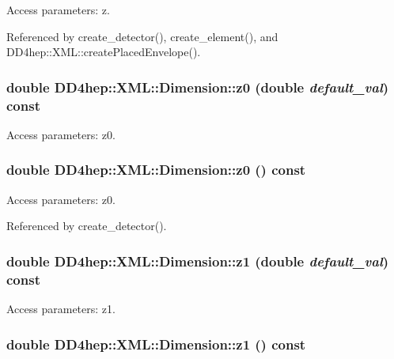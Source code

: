 Access parameters: z. 

Referenced by create\_\-detector(), create\_\-element(), and DD4hep::XML::createPlacedEnvelope().\hypertarget{struct_d_d4hep_1_1_x_m_l_1_1_dimension_a2839cdcdcb0d64a06bf6ab5288a38c35}{
\subsubsection[{z0}]{\setlength{\rightskip}{0pt plus 5cm}double DD4hep::XML::Dimension::z0 (double {\em default\_\-val}) const}}
\label{struct_d_d4hep_1_1_x_m_l_1_1_dimension_a2839cdcdcb0d64a06bf6ab5288a38c35}


Access parameters: z0. \hypertarget{struct_d_d4hep_1_1_x_m_l_1_1_dimension_ac2a0b56de03d8f4e6b04618a048bbd46}{
\subsubsection[{z0}]{\setlength{\rightskip}{0pt plus 5cm}double DD4hep::XML::Dimension::z0 () const}}
\label{struct_d_d4hep_1_1_x_m_l_1_1_dimension_ac2a0b56de03d8f4e6b04618a048bbd46}


Access parameters: z0. 

Referenced by create\_\-detector().\hypertarget{struct_d_d4hep_1_1_x_m_l_1_1_dimension_a61e075101982a424d46b943485cc787b}{
\subsubsection[{z1}]{\setlength{\rightskip}{0pt plus 5cm}double DD4hep::XML::Dimension::z1 (double {\em default\_\-val}) const}}
\label{struct_d_d4hep_1_1_x_m_l_1_1_dimension_a61e075101982a424d46b943485cc787b}


Access parameters: z1. \hypertarget{struct_d_d4hep_1_1_x_m_l_1_1_dimension_a608b53b98761283698390327912a8528}{
\subsubsection[{z1}]{\setlength{\rightskip}{0pt plus 5cm}double DD4hep::XML::Dimension::z1 () const}}
\label{struct_d_d4hep_1_1_x_m_l_1_1_dimension_a608b53b98761283698390327912a8528}


